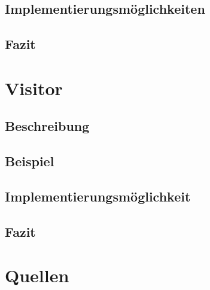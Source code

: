 \documentclass[a4paper,11pt]{scrartcl}
\begin{document}
\subsection{Implementierungsmöglichkeiten}

\subsection{Fazit}


\section{Visitor}

\subsection{Beschreibung}

\subsection{Beispiel}

\subsection{Implementierungsmöglichkeit}

\subsection{Fazit}


\pagebreak
\section{Quellen}

\end{document}

